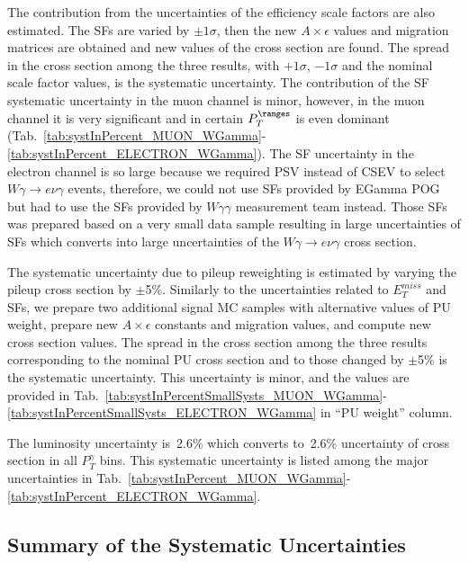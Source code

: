
The contribution from the uncertainties of the efficiency scale factors are also estimated. The SFs are varied by $\pm 1\sigma$, then the new $A \times \epsilon$ values and migration matrices are obtained and new values of the cross section are found. The spread in the cross section among the three results, with $+1\sigma$, $-1\sigma$ and the nominal scale factor values, is the systematic uncertainty. The contribution of the SF systematic uncertainty in the muon channel is minor, however, in the muon channel it is very significant and in certain $P_T^{\ranges}$ is even dominant (Tab.~\ref{tab:systInPercent_MUON_WGamma}-\ref{tab:systInPercent_ELECTRON_WGamma}). The SF uncertainty in the electron channel is so large because we required PSV instead of CSEV to select $W\gamma\rightarrow e\nu\gamma$ events, therefore, we could not use SFs provided by EGamma POG but had to use the SFs provided by $W\gamma\gamma$ measurement team instead. Those SFs was prepared based on a very small data sample resulting in large uncertainties of SFs which converts into large uncertainties of the $W\gamma\rightarrow e\nu\gamma$ cross section. 



The systematic uncertainty due to pileup reweighting is estimated by varying the pileup cross section by $\pm$5\%. Similarly to the uncertainties related to $E_T^{miss}$ and SFs, we prepare two additional signal MC samples with alternative values of PU weight, prepare new $A \times \epsilon$ constants and migration values, and compute new cross section values. The spread in the cross section among the three results corresponding to the nominal PU cross section and to those changed by $\pm$5\% is the systematic uncertainty. This uncertainty is minor, and the values are provided in Tab.~\ref{tab:systInPercentSmallSysts_MUON_WGamma}-\ref{tab:systInPercentSmallSysts_ELECTRON_WGamma} in ``PU weight'' column.

The luminosity uncertainty is~2.6\% which converts to~2.6\% uncertainty of cross section in all $P_T^{\gamma}$ bins. This systematic uncertainty is listed among the major uncertainties in Tab.~\ref{tab:systInPercent_MUON_WGamma}-\ref{tab:systInPercent_ELECTRON_WGamma}.

\subsection{Summary of the Systematic Uncertainties}


